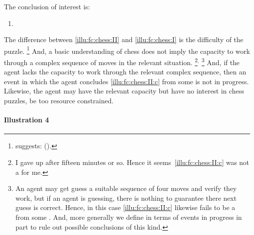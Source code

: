 \begin{note}[Chess II]
  \noindent%
  The conclusion of interest is:
  \begin{enumerate}[label=C\thescenarioCounter., ref=C\thescenarioCounter]
  \item
    \label{illu:fc:chess:II:c}
  \end{enumerate}
  The difference between \autoref{illu:fc:chess:II} and \autoref{illu:fc:chess:I} is the difficulty of the puzzle.%
  \footnote{
    \citeauthor{Emms:2000aa} suggests:
    (\citeyear[46]{Emms:2000aa}).
  }
  And, a basic understanding of chess does not imply the capacity to work through a complex sequence of moves in the relevant situation.%
  \footnote{
    I gave up after fifteen minutes or so.
    Hence it seems~\ref{illu:fc:chess:II:c} was not a \fc{} for me.
  }\(^{,}\)%
  \footnote{
    An agent may get guess a suitable sequence of four moves and verify they work, but if an agent is guessing, there is nothing to guarantee there next guess is correct.
    Hence, in this case \ref{illu:fc:chess:II:c} likewise fails to be a \fc{} from some \pool{}.
    And, more generally we define  in terms of events in progress in part to rule out possible conclusions of this kind.
  }
  And, if the agent lacks the capacity to work through the relevant complex sequence, then an event in which the agent concludes \ref{illu:fc:chess:II:c} from some \pool{} is not in progress.
  Likewise, the agent may have the relevant capacity but have no interest in chess puzzles, be too resource constrained.
\end{note}

\paragraph{Illustration 4}

